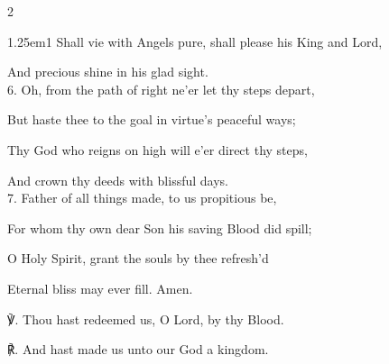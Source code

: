 \begin{multicols}{2}
\begin{hangparas}{1.25em}{1}
Shall vie with Angels pure, shall please his King and Lord,

And precious shine in his glad sight.\\

6. Oh, from the path of right ne'er let thy steps depart,

But haste thee to the goal in virtue's peaceful ways;

Thy God who reigns on high will e'er direct thy steps,

And crown thy deeds with blissful days.\\

7. Father of all things made, to us propitious be,

For whom thy own dear Son his saving Blood did spill;

O Holy Spirit, grant the souls by thee refresh'd

Eternal bliss may ever fill. Amen.\\
\end{hangparas}

℣. Thou hast redeemed us, O Lord, by thy Blood.

℟. And hast made us unto our God a kingdom.


\fussy
\end{multicols}


\mattins
{}

